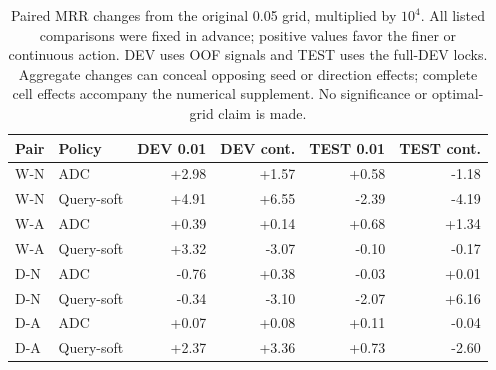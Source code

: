 \begin{table}[htbp]
\centering\footnotesize\setlength{\tabcolsep}{4pt}
\caption{Paired MRR changes from the original 0.05 grid, multiplied by $10^4$. All listed comparisons were fixed in advance; positive values favor the finer or continuous action. DEV uses OOF signals and TEST uses the full-DEV locks. Aggregate changes can conceal opposing seed or direction effects; complete cell effects accompany the numerical supplement. No significance or optimal-grid claim is made.}
\label{tab:grid-effects}
\begin{tabular}{llrrrr}
\toprule
Pair & Policy & DEV 0.01 & DEV cont. & TEST 0.01 & TEST cont.\\
\midrule
W-N & ADC & +2.98 & +1.57 & +0.58 & -1.18\\
W-N & Query-soft & +4.91 & +6.55 & -2.39 & -4.19\\
W-A & ADC & +0.39 & +0.14 & +0.68 & +1.34\\
W-A & Query-soft & +3.32 & -3.07 & -0.10 & -0.17\\
D-N & ADC & -0.76 & +0.38 & -0.03 & +0.01\\
D-N & Query-soft & -0.34 & -3.10 & -2.07 & +6.16\\
D-A & ADC & +0.07 & +0.08 & +0.11 & -0.04\\
D-A & Query-soft & +2.37 & +3.36 & +0.73 & -2.60\\
\bottomrule
\end{tabular}
\end{table}
